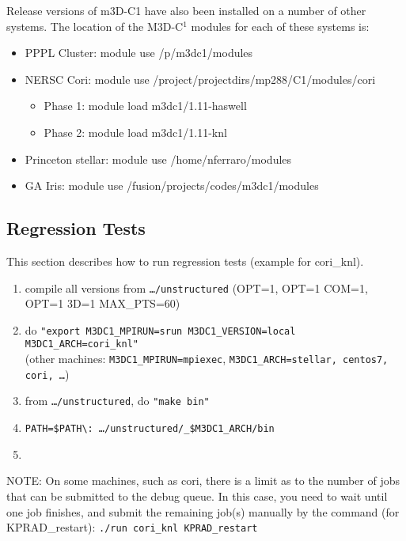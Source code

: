 Release versions of m3D-C1 have also been installed on a number of other systems.   The location of the M3D-C$^{1}$ modules for each of these systems is:
\begin{itemize}
\item	PPPL Cluster:	module use /p/m3dc1/modules
\item	NERSC Cori:	module use /project/projectdirs/mp288/C1/modules/cori
\begin{itemize}
\item		Phase 1: module load m3dc1/1.11-haswell
\item		Phase 2: module load m3dc1/1.11-knl
\end{itemize}
\item	Princeton stellar:	module use /home/nferraro/modules
\item	GA Iris:		module use /fusion/projects/codes/m3dc1/modules
\end{itemize}

\subsection{Regression Tests}
This section describes how to run regression tests (example for cori\_knl).

\begin{enumerate}
\item compile all versions from \texttt{\ldots/unstructured} (OPT=1, OPT=1 COM=1, OPT=1 3D=1 MAX\_PTS=60)
\item do \texttt{"export M3DC1\_MPIRUN=srun M3DC1\_VERSION=local M3DC1\_ARCH=cori\_knl"}
\\
(other machines: \texttt{M3DC1\_MPIRUN=mpiexec}, \texttt{M3DC1\_ARCH=stellar, centos7, cori, \ldots})
\item from \texttt{\ldots/unstructured}, do \texttt{"make bin"}
\item \texttt{PATH=\$PATH\textbackslash: \ldots/unstructured/\_\$M3DC1\_ARCH/bin}
\item 
{}
\end{enumerate}

NOTE:  On some machines, such as cori, there is a limit as to the number of jobs that can be submitted to the debug queue.   In this case, you need to wait until one job finishes, and submit the remaining job(s) manually by the command (for KPRAD\_restart):
\texttt{./run cori\_knl KPRAD\_restart}

